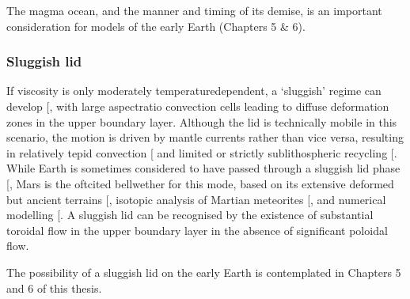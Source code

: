 \documentclass[letterpaper,10pt,english]{jupyterBook}
\begin{document}
\sphinxAtStartPar
The magma ocean, and the manner and timing of its demise, is an important consideration for models of the early Earth (Chapters 5 \& 6).


\subsubsection{Sluggish lid}
\label{\detokenize{content/chapter_01_background/main:sluggish-lid}}
\sphinxAtStartPar
If viscosity is only moderately temperature\sphinxhyphen{}dependent, a ‘sluggish’ regime can develop {[}\sphinxcite{references:id408}{]}, with large aspect\sphinxhyphen{}ratio convection cells leading to diffuse deformation zones in the upper boundary layer. Although the lid is technically mobile in this scenario, the motion is driven by mantle currents rather than vice versa, resulting in relatively tepid convection {[}\sphinxcite{references:id456}{]} and limited or strictly sub\sphinxhyphen{}lithospheric recycling {[}\sphinxcite{references:id269}{]}. While Earth is sometimes considered to have passed through a sluggish lid phase {[}\sphinxcite{references:id348}{]}, Mars is the oft\sphinxhyphen{}cited bellwether for this mode, based on its extensive deformed but ancient terrains {[}\sphinxcite{references:id237}{]}, isotopic analysis of Martian meteorites {[}\sphinxcite{references:id239}{]}, and numerical modelling {[}\sphinxcite{references:id238}{]}. A sluggish lid can be recognised by the existence of substantial toroidal flow in the upper boundary layer in the absence of significant poloidal flow.

\sphinxAtStartPar
The possibility of a sluggish lid on the early Earth is contemplated in Chapters 5 and 6 of this thesis.
\end{document}
